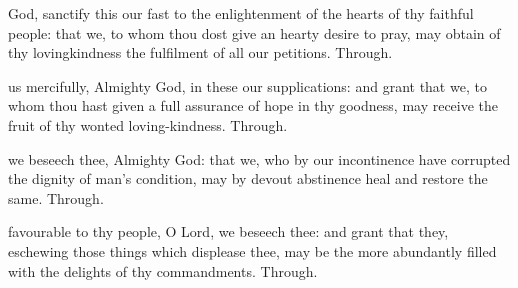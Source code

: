 \mattins



{} God, sanctify this our fast to the enlightenment of the hearts of thy faithful people: that we, to whom thou dost give an hearty desire to pray, may obtain of thy lovingkindness the fulfilment of all our petitions. Through.

\secondEvensong



 us mercifully, Almighty God, in these our supplications: and grant that we, to whom thou hast given a full assurance of hope in thy goodness, may receive the fruit of thy wonted loving-kindness. Through.



\mattins



{} we beseech thee, Almighty God: that we, who by our incontinence have corrupted the dignity of man's condition, may by devout abstinence heal and restore the same. Through.

\secondEvensong



 favourable to thy people, O Lord, we beseech thee: and grant that they, eschewing those things which displease thee, may be the more abundantly filled with the delights of thy commandments. Through.



